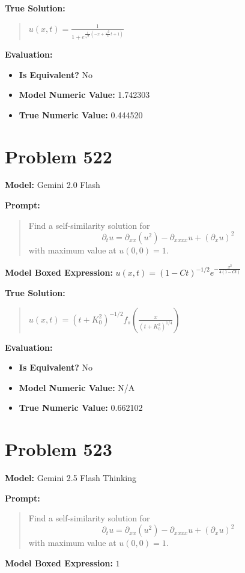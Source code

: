 \documentclass{article}
\begin{document}
\textbf{True Solution:}
\begin{quote}
$u(x,t) = \frac{1}{1+e^{\frac{1}{\sqrt{2}}(-x + \frac{\sqrt{2}}{4}t + 1)}}$
\end{quote}

\textbf{Evaluation:}
\begin{itemize}
\item \textbf{Is Equivalent?} No
\item \textbf{Model Numeric Value:} 1.742303
\item \textbf{True Numeric Value:} 0.444520
\end{itemize}
\vspace{1cm}
\section*{Problem 522}
\textbf{Model:} Gemini 2.0 Flash

\textbf{Prompt:}
\begin{quote}
Find a self-similarity solution for $$ \partial_t u = \partial_{xx}(u^2) - \partial_{xxxx}u + (\partial_x u)^2 $$ with maximum value at $u(0,0) = 1$.
\end{quote}
\textbf{Model Boxed Expression:} $u(x,t) = (1 - Ct)^{-1/2} e^{-\frac{x^2}{4(1 - Ct)}}$

\textbf{True Solution:}
\begin{quote}
$u(x,t) = (t+K_0^2)^{-1/2} f_s\left( \frac{x}{(t+K_0^2)^{1/4}} \right)$
\end{quote}

\textbf{Evaluation:}
\begin{itemize}
\item \textbf{Is Equivalent?} No
\item \textbf{Model Numeric Value:} N/A
\item \textbf{True Numeric Value:} 0.662102
\end{itemize}
\vspace{1cm}
\section*{Problem 523}
\textbf{Model:} Gemini 2.5 Flash Thinking

\textbf{Prompt:}
\begin{quote}
Find a self-similarity solution for $$ \partial_t u = \partial_{xx}(u^2) - \partial_{xxxx}u + (\partial_x u)^2 $$ with maximum value at $u(0,0) = 1$.
\end{quote}
\textbf{Model Boxed Expression:} $1$
\end{document}
